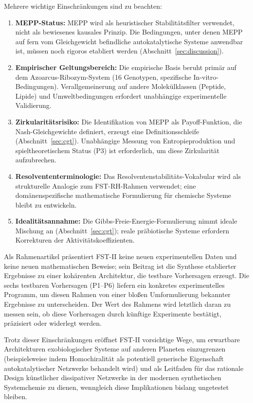 \documentclass[12pt,a4paper]{article}
\theoremstyle{remark}
\begin{document}
Mehrere wichtige Einschränkungen sind zu beachten:
\begin{enumerate}[label=(L\arabic*)]
    \item \textbf{MEPP-Status:} MEPP wird als heuristischer Stabilitätsfilter verwendet, nicht als bewiesenes kausales Prinzip. Die Bedingungen, unter denen MEPP auf fern vom Gleichgewicht befindliche autokatalytische Systeme anwendbar ist, müssen noch rigoros etabliert werden (Abschnitt~\ref{sec:discussion}).
    \item \textbf{Empirischer Geltungsbereich:} Die empirische Basis beruht primär auf dem Azoarcus-Ribozym-System (16 Genotypen, spezifische In-vitro-Bedingungen). Verallgemeinerung auf andere Molekülklassen (Peptide, Lipide) und Umweltbedingungen erfordert unabhängige experimentelle Validierung.
    \item \textbf{Zirkularitätsrisiko:} Die Identifikation von MEPP als Payoff-Funktion, die Nash-Gleichgewichte definiert, erzeugt eine Definitionsschleife (Abschnitt~\ref{sec:cgt}). Unabhängige Messung von Entropieproduktion und spieltheoretischem Status (P3) ist erforderlich, um diese Zirkularität aufzubrechen.
    \item \textbf{Resolvententerminologie:} Das Resolventenstabilitäts-Vokabular wird als strukturelle Analogie zum FST-RH-Rahmen verwendet; eine domänenspezifische mathematische Formulierung für chemische Systeme bleibt zu entwickeln.
    \item \textbf{Idealitätsannahme:} Die Gibbs-Freie-Energie-Formulierung nimmt ideale Mischung an (Abschnitt~\ref{sec:cgt}); reale präbiotische Systeme erfordern Korrekturen der Aktivitätskoeffizienten.
\end{enumerate}
Als Rahmenartikel präsentiert FST-II keine neuen experimentellen Daten und keine neuen mathematischen Beweise; sein Beitrag ist die Synthese etablierter Ergebnisse zu einer kohärenten Architektur, die testbare Vorhersagen erzeugt. Die sechs testbaren Vorhersagen (P1--P6) liefern ein konkretes experimentelles Programm, um diesen Rahmen von einer bloßen Umformulierung bekannter Ergebnisse zu unterscheiden. Der Wert des Rahmens wird letztlich daran zu messen sein, ob diese Vorhersagen durch künftige Experimente bestätigt, präzisiert oder widerlegt werden.

Trotz dieser Einschränkungen eröffnet FST-II vorsichtige Wege, um erwartbare Architekturen exobiologischer Systeme auf anderen Planeten einzugrenzen (beispielsweise indem Homochiralität als potentiell generische Eigenschaft autokatalytischer Netzwerke behandelt wird) und als Leitfaden für das rationale Design künstlicher dissipativer Netzwerke in der modernen synthetischen Systemchemie zu dienen, wenngleich diese Implikationen bislang ungetestet bleiben.
\end{document}
